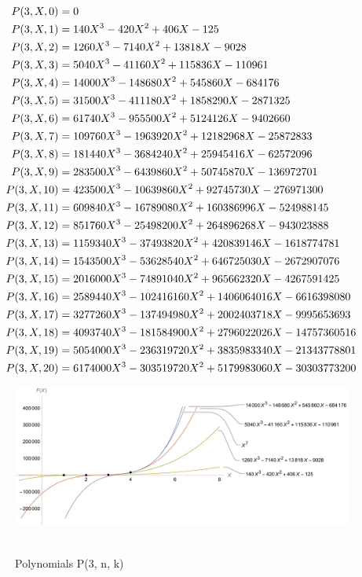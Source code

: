 ﻿\begin{align*}
    {P}(3,X,0) &= 0 \\
    {P}(3,X,1) &= 140X^3 - 420X^2 + 406X - 125 \\
    {P}(3,X,2) &= 1260X^3 - 7140X^2 + 13818X - 9028 \\
    {P}(3,X,3) &= 5040X^3 - 41160X^2 + 115836X - 110961 \\
    {P}(3,X,4) &= 14000X^3 - 148680X^2 + 545860X - 684176 \\
    {P}(3,X,5) &= 31500X^3 - 411180X^2 + 1858290X - 2871325 \\
    {P}(3,X,6) &= 61740X^3 - 955500X^2 + 5124126X - 9402660 \\
    {P}(3,X,7) &= 109760X^3 - 1963920X^2 + 12182968X - 25872833 \\
    {P}(3,X,8) &= 181440X^3 - 3684240X^2 + 25945416X - 62572096 \\
    {P}(3,X,9) &= 283500X^3 - 6439860X^2 + 50745870X - 136972701 \\
    {P}(3,X,10) &= 423500X^3 - 10639860X^2 + 92745730X - 276971300 \\
    {P}(3,X,11) &= 609840X^3 - 16789080X^2 + 160386996X - 524988145 \\
    {P}(3,X,12) &= 851760X^3 - 25498200X^2 + 264896268X - 943023888 \\
    {P}(3,X,13) &= 1159340X^3 - 37493820X^2 + 420839146X - 1618774781 \\
    {P}(3,X,14) &= 1543500X^3 - 53628540X^2 + 646725030X - 2672907076 \\
    {P}(3,X,15) &= 2016000X^3 - 74891040X^2 + 965662320X - 4267591425 \\
    {P}(3,X,16) &= 2589440X^3 - 102416160X^2 + 1406064016X - 6616398080 \\
    {P}(3,X,17) &= 3277260X^3 - 137494980X^2 + 2002403718X - 9995653693 \\
    {P}(3,X,18) &= 4093740X^3 - 181584900X^2 + 2796022026X - 14757360516 \\
    {P}(3,X,19) &= 5054000X^3 - 236319720X^2 + 3835983340X - 21343778801 \\
    {P}(3,X,20) &= 6174000X^3 - 303519720X^2 + 5179983060X - 30303773200
\end{align*}
\begin{figure}[H]
    \centering
    \includegraphics[width=1\textwidth]{sections/images/05_plots_seventh_with_p_3}
    ~\caption{Polynomials P(3, n, k)}\label{fig:figure5}
\end{figure}
